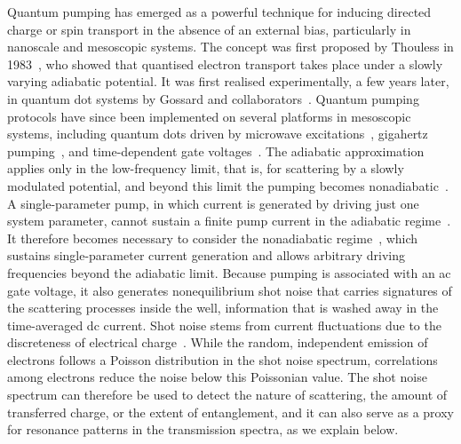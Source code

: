 \documentclass[aps,prb,onecolumn,longbibliography,nofootinbib,citeautoscript,10pt]{revtex4-2}
\begin{document}
Quantum pumping has emerged as a powerful technique for inducing directed charge or spin transport in the absence of an external bias, particularly in nanoscale and mesoscopic systems. The concept was first proposed by Thouless in 1983~\cite{thouless83},  who showed that quantised electron transport takes place under a slowly varying adiabatic potential. It was first realised experimentally, a few years later, in quantum dot systems by Gossard and collaborators~\cite{switkes99}. Quantum pumping protocols have since been implemented on several platforms in mesoscopic systems, including quantum dots driven by microwave excitations~\cite{oosterkamp98},  gigahertz pumping~\cite{blumenthal07},  and time-dependent gate voltages~\cite{dicarlo03}. The adiabatic approximation~\cite{brouwer98, Moskalets04} applies only in the low-frequency limit, that is, for scattering by a slowly modulated potential, and beyond this limit the pumping becomes nonadiabatic~\cite{kaestner08, kim2004}. A single-parameter pump, in which current is generated by driving just one system parameter, cannot sustain a finite pump current in the adiabatic regime~\cite{brouwer98, jose2011}. It therefore becomes necessary to consider the nonadiabatic regime~\cite{PhysRevLett.90.210602, PhysRevB.70.155326},  which sustains single-parameter current generation and allows arbitrary driving frequencies beyond the adiabatic limit. Because pumping is associated with an ac gate voltage, it also generates nonequilibrium shot noise that carries signatures of the scattering processes inside the well, information that is washed away in the time-averaged dc current. Shot noise stems from current fluctuations due to the discreteness of electrical charge~\cite{beenakker03}. While the random, independent emission of electrons follows a Poisson distribution in the shot noise spectrum, correlations among electrons reduce the noise below this Poissonian value. The shot noise spectrum can therefore be used to detect the nature of scattering, the amount of transferred charge, or the extent of entanglement, and it can also serve as a proxy for resonance patterns in the transmission spectra, as we explain below.
\end{document}
